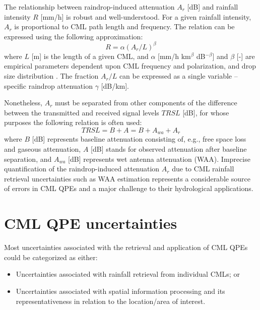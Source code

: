 \documentclass{ctuthesis}\usepackage[]{graphicx}\usepackage[]{color}
\begin{document}
The relationship between raindrop-induced attenuation $A_r$ [dB] and rainfall intensity $R$ [mm/h] is robust and well-understood. For a given rainfall intensity, $A_r$ is proportional to CML path length and frequency. The relation can be expressed using the following approximation:
        \begin{equation} \label{eq:2eq1}
        R = \alpha (A_r / L)^\beta
        \end{equation}
where $L$ [m] is the length of a given CML, and $\alpha$ [mm/h km$^\beta$ dB$^{-\beta}$] and $\beta$ [-] are empirical parameters dependent upon CML frequency and polarization, and drop size distribution \citep{olsenARbRelationCalculation1978}. The fraction $A_r / L$ can be expressed as a single variable -- specific raindrop attenuation $\gamma$ [dB/km].

Nonetheless, $A_r$ must be separated from other components of the difference between the transmitted and received signal levels $T\!R\!S\!L$ [dB], for whose purposes the following relation is often used: 
        \begin{equation} \label{eq:2eq2}
        T\!R\!S\!L = B + A = B + A_{wa} + A_r
        \end{equation}
where $B$ [dB] represents baseline attenuation consisting of, e.g., free space loss and gaseous attenuation, $A$ [dB] stands for observed attenuation after baseline separation, and $A_{wa}$ [dB] represents wet antenna attenuation (WAA). Imprecise quantification of the raindrop-induced attenuation $A_r$ due to CML rainfall retrieval uncertainties such as WAA estimation represents a considerable source of errors in CML QPEs  \citep{chwalaCommercialMicrowaveLink2019} and a major challenge to their hydrological applications.


\section{CML QPE uncertainties}

Most uncertainties associated with the retrieval and application of CML QPEs could be categorized as either: 
\begin{itemize}
        \item Uncertainties associated with rainfall retrieval from individual CMLs; or 
        \item Uncertainties associated with spatial information processing and its representativeness in relation to the location/area of interest.
\end{itemize}
\end{document}
